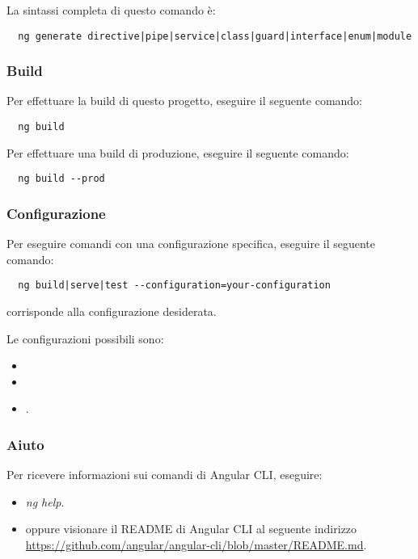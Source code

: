 \documentclass[../manuale-manutentore.tex]{subfiles}
\begin{document}
La sintassi completa di questo comando è:

\begin{verbatim}
  ng generate directive|pipe|service|class|guard|interface|enum|module
\end{verbatim}

\subsubsection{Build}%
\label{subs:build}

Per effettuare la build di questo progetto, eseguire il seguente comando:

\begin{verbatim}
  ng build
\end{verbatim}

Per effettuare una build di produzione, eseguire il seguente comando:

\begin{verbatim}
  ng build --prod
\end{verbatim}

\subsubsection{Configurazione}%
\label{subs:configurazione}

Per eseguire comandi con una configurazione specifica, eseguire il seguente comando:

\begin{verbatim}
  ng build|serve|test --configuration=your-configuration
\end{verbatim}

 corrisponde alla configurazione desiderata.

Le configurazioni possibili sono:
\begin{itemize}
  \item {}
  \item {}
  \item {}.
\end{itemize}

\subsubsection{Aiuto}%
\label{subs:aiuto}

Per ricevere informazioni sui comandi di Angular CLI, eseguire:
\begin{itemize}
  \item \textit{ng help}.
  \item oppure visionare il README di Angular CLI al seguente indirizzo \href{https://github.com/angular/angular-cli/blob/master/README.md}{https://github.com/angular/angular-cli/blob/master/README.md}.
\end{itemize}
\end{document}
